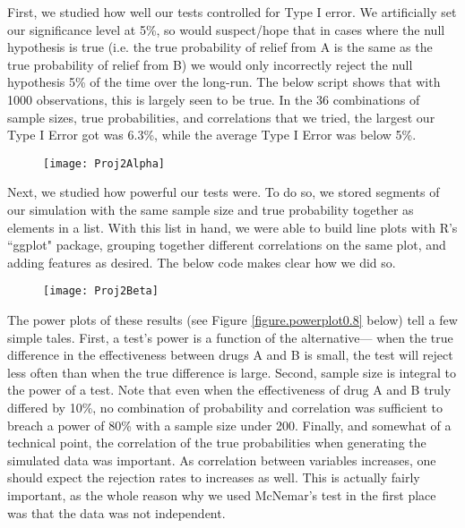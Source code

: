 \documentclass[12pt, letterpaper]{article}
\theoremstyle{definition}
\numberwithin{equation}{section}
\newcommand{\+}[1]{+_{\scalebox{.375}{#1}}}
\newcommand{\1}{\mathbbm{1}}
\begin{document}
\newpage
First, we studied how well our tests controlled for Type I error. We artificially set our significance level at 5\%, so would suspect/hope that in cases where the null hypothesis is true (i.e. the true probability of relief from A is the same as the true probability of relief from B) we would only incorrectly reject the null hypothesis 5\% of the time over the long-run. The below script shows that with 1000 observations, this is largely seen to be true. In the 36 combinations of sample sizes, true probabilities, and correlations that we tried, the largest our Type I Error got was 6.3\%, while the average Type I Error was below 5\%.


\begin{figure}[H]
	\centering
	\texttt{[image: Proj2Alpha]}
	\label{figure.alphacontrol}
\end{figure}


\newpage
Next, we studied how powerful our tests were. To do so, we stored segments of our simulation with the same sample size and true probability together as elements in a list. With this list in hand, we were able to build line plots with R's ``ggplot" package, grouping together different correlations on the same plot, and adding features as desired. The below code makes clear how we did so.

\begin{figure}[H]
	\centering
	\texttt{[image: Proj2Beta]}
\end{figure}

The power plots of these results (see Figure \ref{figure.powerplot0.8} below) tell a few simple tales. First, a test's power is a function of the alternative--- when the true difference in the effectiveness between drugs A and B is small, the test will reject less often than when the true difference is large. Second, sample size is integral to the power of a test. Note that even when the effectiveness of drug A and B truly differed by 10\%, no combination of probability and correlation was sufficient to breach a power of 80\% with a sample size under 200. Finally, and somewhat of a technical point, the correlation of the true probabilities when generating the simulated data was important. As correlation between variables increases, one should expect the rejection rates to increases as well. This is actually fairly important, as the whole reason why we used McNemar's test in the first place was that the data was not independent.
\end{document}
